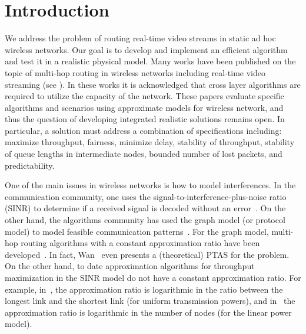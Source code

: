\documentclass[11pt]{article}
\newenvironment{proof sketch}[1]{\noindent {\emph{Proof sketch of #1:}}}{\hfill \qed}
\begin{document}
\section{Introduction}

We address the problem of routing real-time video streams in static ad
hoc wireless networks.  Our goal is to develop and implement an
efficient algorithm and test it in a realistic physical model.  Many
works have been published on the topic of multi-hop routing in
wireless networks including real-time video streaming (see
\cite{setton2005cross,khan2006application,shan2005cross,van2005cross}).
In these works it is acknowledged that cross layer algorithms are
required to utilize the capacity of the network.  These papers
evaluate specific algorithms and scenarios using approximate models
for wireless network, and thus the question of developing integrated
realistic solutions remains open. In particular, a solution must
address a combination of specifications including: maximize
throughput, fairness, minimize delay, stability of throughput,
stability of queue lengths in intermediate nodes, bounded number of
lost packets, and predictability.

One of the main issues in wireless networks is how to model
interferences. In the communication community, one uses the
signal-to-interference-plus-noise ratio (SINR) to determine if a
received signal is decoded without an
error~\cite{gallager1968information}. On the other hand, the
algorithms community has used the graph model (or protocol model) to
model feasible communication
patterns~\cite{jain2005impact,alicherry2005joint11}. For the graph
model, multi-hop routing algorithms with a constant approximation
ratio have been
developed~\cite{kumar2005algorithmic,alicherry2005joint11,buragohain2007improved,wan2009multiflows}.
In fact, Wan~\cite{wan2009multiflows} even presents a (theoretical)
PTAS for the problem. On the other hand, to date approximation
algorithms for throughput maximization in the SINR model do not have a
constant approximation ratio. For example, in~\cite{ChafekarCapacity},
the approximation ratio is logarithmic in the ratio between the
longest link and the shortest link (for uniform transmission powers),
and in~\cite{EMM11} the approximation ratio is logarithmic in the
number of nodes (for the linear power model).
\end{document}
